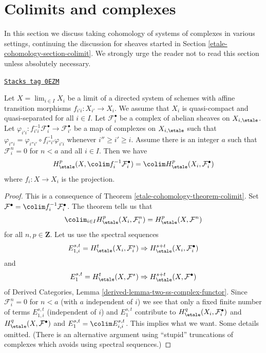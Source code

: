 \section{Colimits and complexes}
\label{etale-cohomology-section-colimit-complexes}
In this section we discuss taking cohomology of systems of complexes
in various settings, continuing the discussion for sheaves started
in Section \ref{etale-cohomology-section-colimit}.
We strongly urge the reader not to read this section unless absolutely
necessary.

\begin{lemma}
\label{etale-cohomology-lemma-colimit-variant-complexes}
\href{https://stacks.math.columbia.edu/tag/0EZM}{\texttt{Stacks tag 0EZM}}

Let $X = \lim_{i \in I} X_i$ be a limit of a directed system of schemes
with affine transition morphisms $f_{i'i} : X_{i'} \to X_i$. We assume
that $X_i$ is quasi-compact and quasi-separated for all $i \in I$.
Let $\mathcal{F}_i^\bullet$ be a complex of abelian sheaves on
$X_{i, \etale}$. Let $\varphi_{i'i} : f_{i'i}^{-1}\mathcal{F}_i^\bullet \to
\mathcal{F}_{i'}^\bullet$ be a map of complexes on $X_{i, \etale}$
such that $\varphi_{i''i} = \varphi_{i''i'} \circ f_{i'' i'}^{-1}\varphi_{i'i}$
whenever $i'' \geq i' \geq i$. Assume there is an integer $a$ such that
$\mathcal{F}_i^n = 0$ for $n < a$ and all $i \in I$.
Then we have
$$
H^p_\etale(X, \colim f_i^{-1}\mathcal{F}_i^\bullet) =
\colim H^p_\etale(X_i, \mathcal{F}^\bullet_i)
$$
where $f_i : X \to X_i$ is the projection.
\end{lemma}

\begin{proof}
This is a consequence of Theorem \ref{etale-cohomology-theorem-colimit}. Set
$\mathcal{F}^\bullet = \colim f_i^{-1}\mathcal{F}_i^\bullet$.
The theorem tells us that
$$
\colim_{i \in I} H_\etale^p(X_i, \mathcal{F}_i^n) =
H_\etale^p(X, \mathcal{F}^n)
$$
for all $n, p \in \mathbf{Z}$. Let us use the spectral sequences
$$
E_{1, i}^{s, t} = H_\etale^t(X_i, \mathcal{F}_i^s) \Rightarrow
H_\etale^{s + t}(X_i, \mathcal{F}_i^\bullet)
$$
and
$$
E_1^{s, t} = H_\etale^t(X, \mathcal{F}^s) \Rightarrow
H_\etale^{s + t}(X, \mathcal{F}^\bullet)
$$
of Derived Categories, Lemma \ref{derived-lemma-two-ss-complex-functor}.
Since $\mathcal{F}_i^n = 0$ for $n < a$ (with $a$ independent of $i$)
we see that only a fixed finite number of terms $E_{1, i}^{s, t}$
(independent of $i$) and $E_1^{s, t}$ contribute to
$H^q_\etale(X_i, \mathcal{F}_i^\bullet)$ and
$H^q_\etale(X, \mathcal{F}^\bullet)$ and $E_1^{s, t} = \colim E_{i, i}^{s, t}$.
This implies what we want. Some details omitted.
(There is an alternative argument using ``stupid'' truncations
of complexes which avoids using spectral sequences.)
\end{proof}

